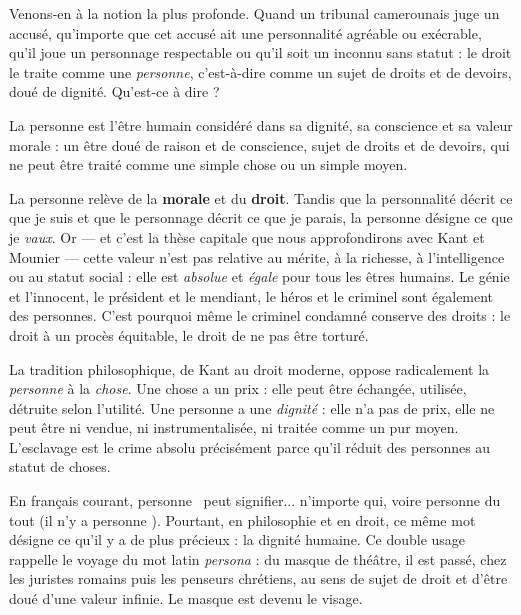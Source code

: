 \documentclass[11pt]{article}
\newcommand{\cle}[1]{{\popxbold\color{popdark}#1}}
\newcounter{popsec}
\newcounter{popsub}
\newcommand{\courssub}[1]{%
  \stepcounter{popsub}%
  \par\vspace{9pt}\noindent{\popxbold\fontsize{11.5}{13}\selectfont\color{popink}{\color{poporange}\thepopsec.\thepopsub}\hspace{6pt}#1}\par\nopagebreak\vspace{4pt}
}
\begin{document}
\courssub{La personne : ce que je vaux}

Venons-en à la notion la plus profonde. Quand un tribunal camerounais juge un accusé, qu'importe que cet accusé ait une personnalité agréable ou exécrable, qu'il joue un personnage respectable ou qu'il soit un inconnu sans statut : le droit le traite comme une \emph{personne}, c'est-à-dire comme un sujet de droits et de devoirs, doué de dignité. Qu'est-ce à dire ?

\begin{definition}[La personne]
La \cle{personne} est l'être humain considéré dans sa dignité, sa conscience et sa valeur morale : un être doué de raison et de conscience, sujet de droits et de devoirs, qui ne peut être traité comme une simple chose ou un simple moyen.
\end{definition}

La personne relève de la \textbf{morale} et du \textbf{droit}. Tandis que la personnalité décrit ce que je suis et que le personnage décrit ce que je parais, la personne désigne ce que je \emph{vaux}. Or — et c'est la thèse capitale que nous approfondirons avec Kant et Mounier — cette valeur n'est pas relative au mérite, à la richesse, à l'intelligence ou au statut social : elle est \emph{absolue} et \emph{égale} pour tous les êtres humains. Le génie et l'innocent, le président et le mendiant, le héros et le criminel sont également des personnes. C'est pourquoi même le criminel condamné conserve des droits : le droit à un procès équitable, le droit de ne pas être torturé.

\begin{propriete}
La tradition philosophique, de Kant au droit moderne, oppose radicalement la \emph{personne} à la \emph{chose}. Une chose a un prix : elle peut être échangée, utilisée, détruite selon l'utilité. Une personne a une \emph{dignité} : elle n'a pas de prix, elle ne peut être ni vendue, ni instrumentalisée, ni traitée comme un pur moyen. L'esclavage est le crime absolu précisément parce qu'il réduit des personnes au statut de choses.
\end{propriete}

\begin{savaistu}
En français courant, \guillemotleft personne \guillemotright\ peut signifier... n'importe qui, voire personne du tout (\guillemotleft il n'y a personne \guillemotright). Pourtant, en philosophie et en droit, ce même mot désigne ce qu'il y a de plus précieux : la dignité humaine. Ce double usage rappelle le voyage du mot latin \emph{persona} : du masque de théâtre, il est passé, chez les juristes romains puis les penseurs chrétiens, au sens de sujet de droit et d'être doué d'une valeur infinie. Le masque est devenu le visage.
\end{savaistu}
\end{document}
